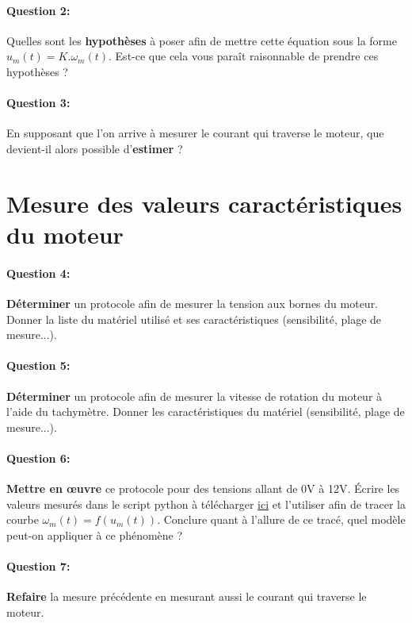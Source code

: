 \paragraph{Question 2:} Quelles sont les \textbf{hypothèses} à poser afin de mettre cette équation sous la forme $u_m(t)=K.\omega_m(t)$. Est-ce que cela vous paraît raisonnable de prendre ces hypothèses ?

\paragraph{Question 3:} En supposant que l'on arrive à mesurer le courant qui traverse le moteur, que devient-il alors possible d'\textbf{estimer} ?

\newpage

\section{Mesure des valeurs caractéristiques du moteur} 

\paragraph{Question 4:} \textbf{Déterminer} un protocole afin de mesurer la tension aux bornes du moteur. Donner la liste du matériel utilisé et ses caractéristiques (sensibilité, plage de mesure...).

\paragraph{Question 5:} \textbf{Déterminer} un protocole afin de mesurer la vitesse de rotation du moteur à l'aide du tachymètre. Donner les caractéristiques du matériel (sensibilité, plage de mesure...).

\paragraph{Question 6:} \textbf{Mettre en \oe uvre} ce protocole pour des tensions allant de 0V à 12V. Écrire les valeurs mesurés dans le script python à télécharger 
\href{https://github.com/Costadoat/Sciences-Ingenieur/raw/master/S01\%20\nomsequence/TP01\%20Mod\%C3\%A9lisation\%20lin\%C3\%A9aire/Ilot_01\%20Moteur\%20\%C3\%A0\%20courant\%20continu/01-TP01-I01.py}{ici} 
et l'utiliser afin de tracer la courbe $\omega_m(t)=f(u_m(t))$. Conclure quant à l'allure de ce tracé, quel modèle peut-on appliquer à ce phénomène ?

\paragraph{Question 7:} \textbf{Refaire} la mesure précédente en mesurant aussi le courant qui traverse le moteur.

